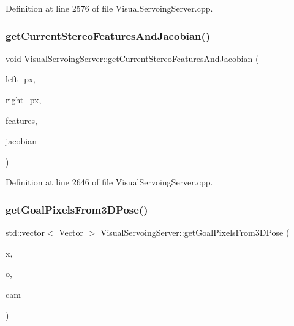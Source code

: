 Definition at line 2576 of file Visual\+Servoing\+Server.\+cpp.

\mbox{\label{classVisualServoingServer_ad5334ed717f373cfbd40290824d9ed1f}} 
\subsubsection{\texorpdfstring{get\+Current\+Stereo\+Features\+And\+Jacobian()}{getCurrentStereoFeaturesAndJacobian()}}
{\footnotesize\ttfamily void Visual\+Servoing\+Server\+::get\+Current\+Stereo\+Features\+And\+Jacobian (\begin{DoxyParamCaption}\item[{const std\+::vector$<$ yarp\+::sig\+::\+Vector $>$ \&}]{left\+\_\+px,  }\item[{const std\+::vector$<$ yarp\+::sig\+::\+Vector $>$ \&}]{right\+\_\+px,  }\item[{yarp\+::sig\+::\+Vector \&}]{features,  }\item[{yarp\+::sig\+::\+Matrix \&}]{jacobian }\end{DoxyParamCaption})\hspace{0.3cm}{\ttfamily [private]}}



Definition at line 2646 of file Visual\+Servoing\+Server.\+cpp.

\mbox{\label{classVisualServoingServer_a9d35a09c55cc8c059dc7bdbeeed8cfb1}} 
\subsubsection{\texorpdfstring{get\+Goal\+Pixels\+From3\+D\+Pose()}{getGoalPixelsFrom3DPose()}}
{\footnotesize\ttfamily std\+::vector$<$ Vector $>$ Visual\+Servoing\+Server\+::get\+Goal\+Pixels\+From3\+D\+Pose (\begin{DoxyParamCaption}\item[{const yarp\+::sig\+::\+Vector \&}]{x,  }\item[{const yarp\+::sig\+::\+Vector \&}]{o,  }\item[{const Cam\+Sel \&}]{cam }\end{DoxyParamCaption})\hspace{0.3cm}{\ttfamily [override]}}



